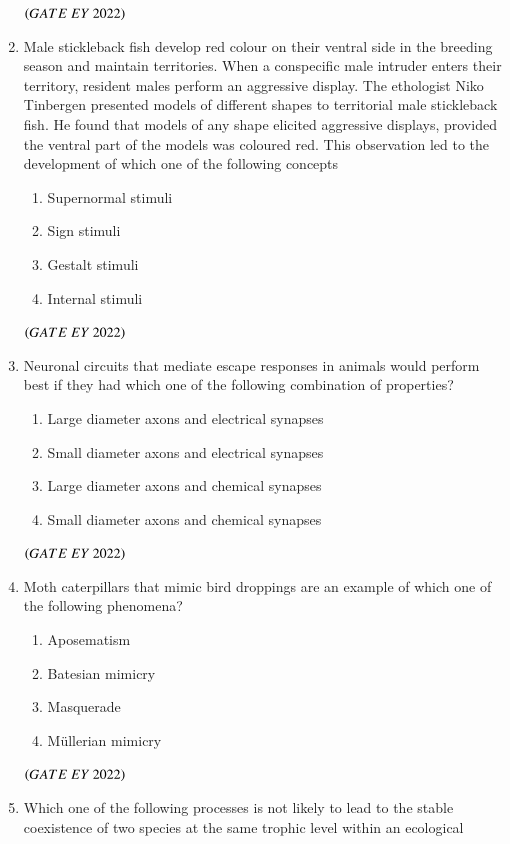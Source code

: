 \documentclass[journal]{IEEEtran}
\numberwithin{equation}{enumi}
\numberwithin{figure}{enumi}
\begin{document}
\begin{enumerate}
    \hfill{$\brak{ GATE\ EY\ 2022}$}
    \bigskip
 \item Male stickleback fish develop red colour on their ventral side in the breeding
season and maintain territories. When a conspecific male intruder enters their
territory, resident males perform an aggressive display. The ethologist Niko
Tinbergen presented models of different shapes to territorial male stickleback fish.
He found that models of any shape elicited aggressive displays, provided the
ventral part of the models was coloured red. This observation led to the
development of which one of the following concepts
    \begin{enumerate}
        \item  Supernormal stimuli
        \item  Sign stimuli
        \item  Gestalt stimuli
        \item  Internal stimuli
    \end{enumerate}
    \hfill{$\brak{ GATE\ EY\ 2022}$}
    \bigskip
 \item Neuronal circuits that mediate escape responses in animals would perform best if
they had which one of the following combination of properties?
    \begin{enumerate}
        \item  Large diameter axons and electrical synapses
        \item  Small diameter axons and electrical synapses
        \item  Large diameter axons and chemical synapses
        \item  Small diameter axons and chemical synapses
    \end{enumerate}
    \hfill{$\brak{ GATE\ EY\ 2022}$}
    \bigskip
 \item Moth caterpillars that mimic bird droppings are an example of which one of the
following phenomena?
    \begin{enumerate}
        \item  Aposematism
        \item  Batesian mimicry
        \item  Masquerade
        \item  Müllerian mimicry
    \end{enumerate}
    \hfill{$\brak{ GATE\ EY\ 2022}$}
    \bigskip
 \item Which one of the following processes is not likely to lead to the stable
coexistence of two species at the same trophic level within an ecological

\end{enumerate}
\end{document}
